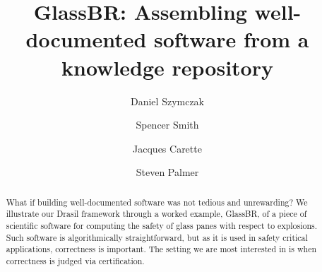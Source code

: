 \documentclass[sigconf]{acmart}
\begin{document}
\title[Assembling Software from Knowledge]{GlassBR: Assembling well-documented software from a knowledge repository}

\author{Daniel Szymczak}

\author{Spencer Smith}

\author{Jacques Carette}

\author{Steven Palmer}


\begin{abstract}

What if building well-documented software was not tedious and unrewarding?  We illustrate our Drasil framework through a worked example, GlassBR, of a piece of scientific software for computing the safety of glass panes with respect to explosions.  Such software is algorithmically straightforward, but as it is used in safety critical applications, correctness is important.  The setting we are most interested in is when correctness is judged via certification.

\end{abstract}
\end{document}
